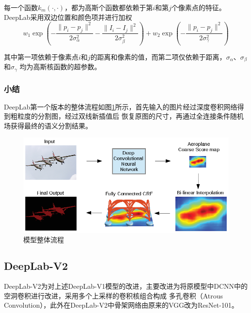 \documentclass[10pt, a4paper]{article}
\begin{document}
每一个函数$k_m(\cdot, \cdot)$，都为高斯个函数都依赖于第$i$和第$j$个像素点的特征。DeepLab采用双边位置和颜色项并进行加权
\begin{equation}
    w_1\exp\left(-\frac{\|p_i - p_j\|^2}{2\sigma_\alpha^2} - \frac{\|I_i - I_j\|^2}{2\sigma_\beta^2}\right) + 
    w_2\exp\left(-\frac{\|p_i - p_j\|^2}{2\sigma_\gamma^2}\right)
\end{equation}

其中第一项依赖于像素点$i$和$j$的距离和像素的值，而第二项仅依赖于距离，$\sigma_\alpha$、$\sigma_\beta$和$\sigma_\gamma$
均为高斯核函数的超参数。

\subsubsection{小结}
DeepLab第一个版本的整体流程如图\ref{p4}所示，首先输入的图片经过深度卷积网络得到粗粒度的分割图，经过双线新插值后
恢复原图的尺寸，再通过全连接条件随机场获得最终的语义分割结果。
\begin{figure}[htbp]
    \centering
    \includegraphics[width=\textwidth]{p4.eps}
    \caption{模型整体流程}
    \label{p4}
\end{figure}

\subsection{DeepLab-V2}
DeepLab-V2为对上述DeepLab-V1模型的改进，主要改进为将原模型中DCNN中的空洞卷积进行改进，采用多个上采样的卷积核组合构成
多孔卷积（Atrous Convolution），此外在DeepLab-V2中骨架网络由原来的VGG改为ResNet-101\cite{ResNet}。
\end{document}
